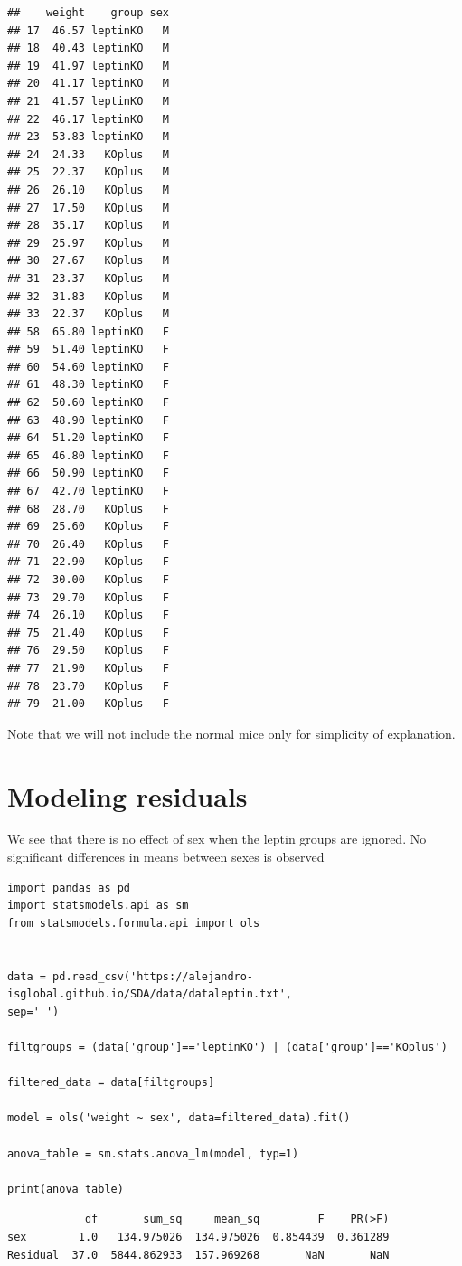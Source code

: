 \documentclass[
]{book}
\begin{document}
\begin{verbatim}
##    weight    group sex
## 17  46.57 leptinKO   M
## 18  40.43 leptinKO   M
## 19  41.97 leptinKO   M
## 20  41.17 leptinKO   M
## 21  41.57 leptinKO   M
## 22  46.17 leptinKO   M
## 23  53.83 leptinKO   M
## 24  24.33   KOplus   M
## 25  22.37   KOplus   M
## 26  26.10   KOplus   M
## 27  17.50   KOplus   M
## 28  35.17   KOplus   M
## 29  25.97   KOplus   M
## 30  27.67   KOplus   M
## 31  23.37   KOplus   M
## 32  31.83   KOplus   M
## 33  22.37   KOplus   M
## 58  65.80 leptinKO   F
## 59  51.40 leptinKO   F
## 60  54.60 leptinKO   F
## 61  48.30 leptinKO   F
## 62  50.60 leptinKO   F
## 63  48.90 leptinKO   F
## 64  51.20 leptinKO   F
## 65  46.80 leptinKO   F
## 66  50.90 leptinKO   F
## 67  42.70 leptinKO   F
## 68  28.70   KOplus   F
## 69  25.60   KOplus   F
## 70  26.40   KOplus   F
## 71  22.90   KOplus   F
## 72  30.00   KOplus   F
## 73  29.70   KOplus   F
## 74  26.10   KOplus   F
## 75  21.40   KOplus   F
## 76  29.50   KOplus   F
## 77  21.90   KOplus   F
## 78  23.70   KOplus   F
## 79  21.00   KOplus   F
\end{verbatim}

Note that we will not include the normal mice only for simplicity of explanation.

\hypertarget{modeling-residuals}{%
\section{Modeling residuals}\label{modeling-residuals}}

We see that there is no effect of sex when the leptin groups are ignored. No significant differences in means between sexes is observed

\begin{verbatim}
import pandas as pd
import statsmodels.api as sm
from statsmodels.formula.api import ols


data = pd.read_csv('https://alejandro-isglobal.github.io/SDA/data/dataleptin.txt', 
sep=' ')

filtgroups = (data['group']=='leptinKO') | (data['group']=='KOplus')

filtered_data = data[filtgroups]

model = ols('weight ~ sex', data=filtered_data).fit()

anova_table = sm.stats.anova_lm(model, typ=1)

print(anova_table)
\end{verbatim}

\begin{verbatim}
            df       sum_sq     mean_sq         F    PR(>F)
sex        1.0   134.975026  134.975026  0.854439  0.361289
Residual  37.0  5844.862933  157.969268       NaN       NaN
\end{verbatim}
\end{document}
